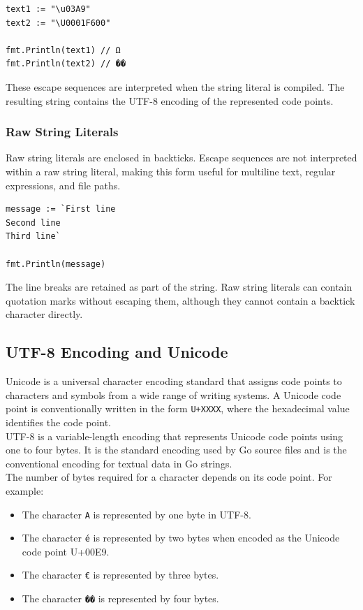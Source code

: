 \begin{lstlisting}
text1 := "\u03A9"
text2 := "\U0001F600"

fmt.Println(text1) // Ω
fmt.Println(text2) // ��
\end{lstlisting}

These escape sequences are interpreted when the string literal is compiled. The resulting string contains the UTF-8 encoding of the represented code points.

\subsubsection{Raw String Literals}

Raw string literals are enclosed in backticks. Escape sequences are not interpreted within a raw string literal, making this form useful for multiline text, regular expressions, and file paths.

\begin{lstlisting}
message := `First line
Second line
Third line`

fmt.Println(message)
\end{lstlisting}

The line breaks are retained as part of the string. Raw string literals can contain quotation marks without escaping them, although they cannot contain a backtick character directly.

\subsection{UTF-8 Encoding and Unicode}

Unicode is a universal character encoding standard that assigns code points to characters and symbols from a wide range of writing systems. A Unicode code point is conventionally written in the form \texttt{U+XXXX}, where the hexadecimal value identifies the code point.\\

UTF-8 is a variable-length encoding that represents Unicode code points using one to four bytes. It is the standard encoding used by Go source files and is the conventional encoding for textual data in Go strings.\\

The number of bytes required for a character depends on its code point. For example:

\begin{itemize}
    \item The character \texttt{A} is represented by one byte in UTF-8.
    \item The character \texttt{é} is represented by two bytes when encoded as the Unicode code point U+00E9.
    \item The character \texttt{€} is represented by three bytes.
    \item The character \texttt{��} is represented by four bytes.
\end{itemize}

